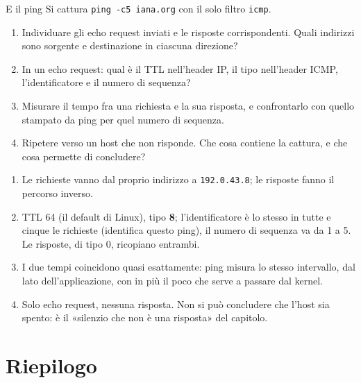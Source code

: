 \begin{esercizio}{E il ping}
Si cattura \texttt{ping -c5 iana.org} con il solo filtro \texttt{icmp}.
\begin{enumerate}[label=(\alph*)]
    \item Individuare gli echo request inviati e le risposte corrispondenti. Quali indirizzi sono sorgente e destinazione in
          ciascuna direzione?
    \item In un echo request: qual è il TTL nell'header IP, il tipo nell'header ICMP, l'identificatore e il numero di sequenza?
    \item Misurare il tempo fra una richiesta e la sua risposta, e confrontarlo con quello stampato da ping per quel numero di
          sequenza.
    \item Ripetere verso un host che non risponde. Che cosa contiene la cattura, e che cosa permette di concludere?
\end{enumerate}

\svolgimento
\begin{enumerate}[label=(\alph*)]
    \item Le richieste vanno dal proprio indirizzo a \texttt{192.0.43.8}; le risposte fanno il percorso inverso.
    \item TTL 64 (il default di Linux), tipo \textbf{8}; l'identificatore è lo stesso in tutte e cinque le richieste (identifica
          questo ping), il numero di sequenza va da 1 a 5. Le risposte, di tipo 0, ricopiano entrambi.
    \item I due tempi coincidono quasi esattamente: ping misura lo stesso intervallo, dal lato dell'applicazione, con in più il
          poco che serve a passare dal kernel.
    \item Solo echo request, nessuna risposta. Non si può concludere che l'host sia spento: è il «silenzio che non è una
          risposta» del capitolo.
\end{enumerate}
\end{esercizio}

\section{Riepilogo}


